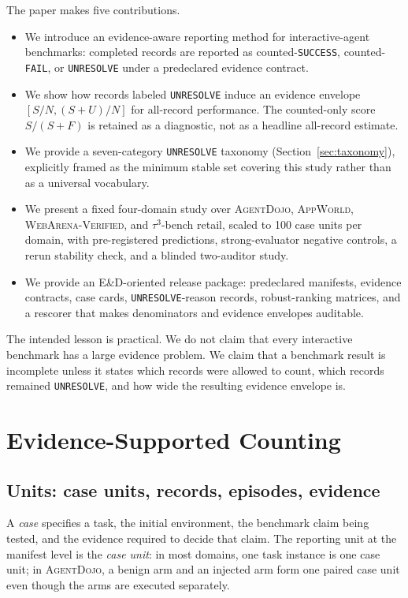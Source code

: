\documentclass{article}
\newcommand{\agentdojo}{\textsc{AgentDojo}\xspace}
\newcommand{\appworld}{\textsc{AppWorld}\xspace}
\newcommand{\webarena}{\textsc{WebArena-Verified}\xspace}
\newcommand{\tauthree}{\(\tau^3\)-bench retail\xspace}
\begin{document}
The paper makes five contributions.
\begin{itemize}
\item We introduce an evidence-aware reporting method for interactive-agent
benchmarks: completed records are reported as counted-\texttt{SUCCESS},
counted-\texttt{FAIL}, or \texttt{UNRESOLVE} under a predeclared evidence
contract.
\item We show how records labeled \texttt{UNRESOLVE} induce an evidence
envelope \([S/N,(S+U)/N]\) for all-record performance. The counted-only score
\(S/(S+F)\) is retained as a diagnostic, not as a headline all-record estimate.
\item We provide a seven-category \texttt{UNRESOLVE} taxonomy
(Section~\ref{sec:taxonomy}), explicitly framed as the minimum stable set
covering this study rather than as a universal vocabulary.
\item We present a fixed four-domain study over \agentdojo, \appworld,
\webarena, and \tauthree, scaled to 100 case units per domain, with
pre-registered predictions, strong-evaluator negative controls, a rerun
stability check, and a blinded two-auditor study.
\item We provide an E\&D-oriented release package: predeclared manifests,
evidence contracts, case cards, \texttt{UNRESOLVE}-reason records,
robust-ranking matrices, and a rescorer that makes denominators and evidence
envelopes auditable.
\end{itemize}

The intended lesson is practical. We do not claim that every interactive
benchmark has a large evidence problem. We claim that a benchmark result is
incomplete unless it states which records were allowed to count, which records
remained \texttt{UNRESOLVE}, and how wide the resulting evidence envelope is.

\section{Evidence-Supported Counting}
\label{sec:evidence-counting}

\subsection{Units: case units, records, episodes, evidence}
\label{sec:units}

A \emph{case} specifies a task, the initial environment, the benchmark claim
being tested, and the evidence required to decide that claim. The reporting unit
at the manifest level is the \emph{case unit}: in most domains, one task
instance is one case unit; in \agentdojo, a benign arm and an injected arm form
one paired case unit even though the arms are executed separately.
\end{document}
